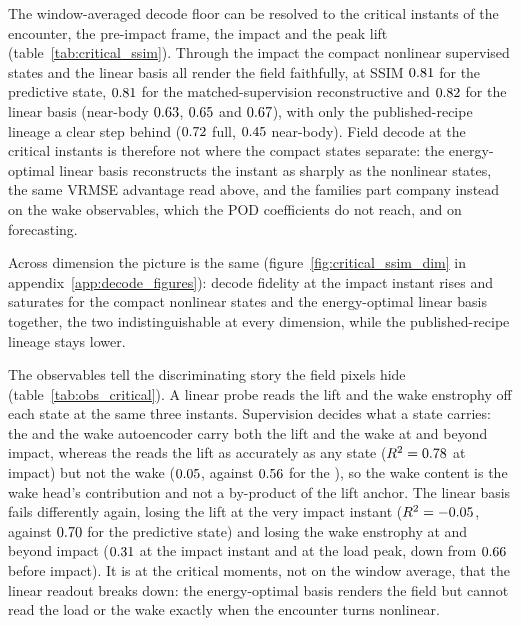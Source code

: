 The window-averaged decode floor can be resolved to the critical instants of the encounter, the pre-impact frame, the impact and the peak lift (table~\ref{tab:critical_ssim}). Through the impact the compact nonlinear supervised states and the linear basis all render the field faithfully, at SSIM $0.81$ for the predictive state, $0.81$ for the matched-supervision reconstructive and $0.82$ for the linear basis (near-body $0.63$, $0.65$ and $0.67$), with only the published-recipe lineage a clear step behind ($0.72$ full, $0.45$ near-body). Field decode at the critical instants is therefore not where the compact states separate: the energy-optimal linear basis reconstructs the instant as sharply as the nonlinear states, the same VRMSE advantage read above, and the families part company instead on the wake observables, which the POD coefficients do not reach, and on forecasting.\re



Across dimension the picture is the same (figure~\ref{fig:critical_ssim_dim} in appendix~\ref{app:decode_figures}): decode fidelity at the impact instant rises and saturates for the compact nonlinear states and the energy-optimal linear basis together, the two indistinguishable at every dimension, while the published-recipe lineage stays lower.\re

The observables tell the discriminating story the field pixels hide (table~\ref{tab:obs_critical}). A linear probe reads the lift and the wake enstrophy off each state at the same three instants. Supervision decides what a state carries: the \PredState{} and the wake autoencoder carry both the lift and the wake at and beyond impact, whereas the \LiftState{} reads the lift as accurately as any state ($R^2 = 0.78$ at impact) but not the wake ($0.05$, against $0.56$ for the \PredState), so the wake content is the wake head's contribution and not a by-product of the lift anchor. The linear basis fails differently again, losing the lift at the very impact instant ($R^2 = -0.05$, against $0.70$ for the predictive state) and losing the wake enstrophy at and beyond impact ($0.31$ at the impact instant and at the load peak, down from $0.66$ before impact). It is at the critical moments, not on the window average, that the linear readout breaks down: the energy-optimal basis renders the field but cannot read the load or the wake exactly when the encounter turns nonlinear.\re

